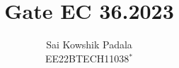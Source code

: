 \documentclass[book,11pt]{IEEEtran}
\begin{document}
\vspace{3cm}

\title{
Gate EC 36.2023
}
\author{ Sai Kowshik Padala\\EE22BTECH11038$^{*}$%
	
	
}	


%
%
%

% 
%



% 
\end{document}
